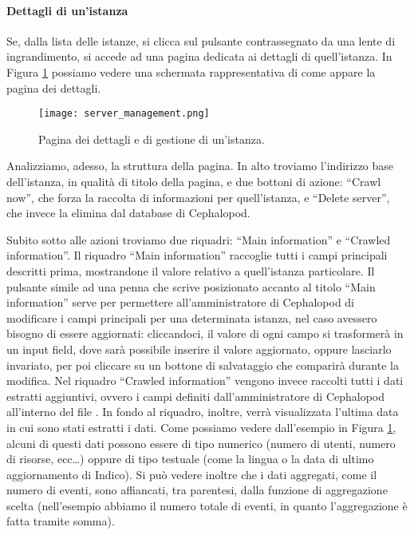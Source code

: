         	\paragraph{Dettagli di un'istanza}Se, dalla lista delle istanze, si clicca sul pulsante contrassegnato da una lente di ingrandimento, si accede ad una pagina dedicata ai dettagli di quell'istanza. In Figura \ref{fig:server_management} possiamo vedere una schermata rappresentativa di come appare la pagina dei dettagli.
        	
        	\begin{figure}[h!]
        		\begin{center}
        			\texttt{[image: server\_management.png]}
        		\end{center}
        		\caption[Dettagli di un'istanza]{Pagina dei dettagli e di gestione di un'istanza.}
        		\label{fig:server_management}
        	\end{figure}
        	
        	Analizziamo, adesso, la struttura della pagina. In alto troviamo l'indirizzo base dell'istanza, in qualità di titolo della pagina, e due bottoni di azione: ``Crawl now'', che forza la raccolta di informazioni per quell'istanza, e ``Delete server'', che invece la elimina dal database di Cephalopod.
        	
        	Subito sotto alle azioni troviamo due riquadri: ``Main information'' e ``Crawled information''. Il riquadro ``Main information'' raccoglie tutti i campi principali descritti prima, mostrandone il valore relativo a quell'istanza particolare. Il pulsante simile ad una penna che scrive posizionato accanto al titolo ``Main information'' serve per permettere all'amministratore di Cephalopod di modificare i campi principali per una determinata istanza, nel caso avessero bisogno di essere aggiornati: cliccandoci, il valore di ogni campo si trasformerà in un input field, dove sarà possibile inserire il valore aggiornato, oppure lasciarlo invariato, per poi cliccare su un bottone di salvataggio che comparirà durante la modifica. Nel riquadro ``Crawled information'' vengono invece raccolti tutti i dati estratti aggiuntivi, ovvero i campi definiti dall'amministratore di Cephalopod all'interno del file . In fondo al riquadro, inoltre, verrà visualizzata l'ultima data in cui sono stati estratti i dati. Come possiamo vedere dall'esempio in Figura \ref{fig:server_management}, alcuni di questi dati possono essere di tipo numerico (numero di utenti, numero di risorse, ecc\dots) oppure di tipo testuale (come la lingua o la data di ultimo aggiornamento di Indico). Si può vedere inoltre che i dati aggregati, come il numero di eventi, sono affiancati, tra parentesi, dalla funzione di aggregazione scelta (nell'esempio abbiamo il numero totale di eventi, in quanto l'aggregazione è fatta tramite somma).
        	
